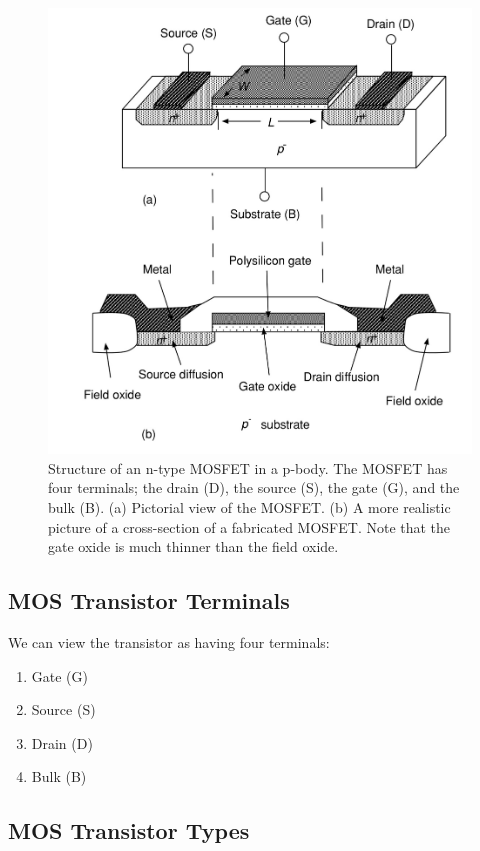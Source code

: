 \documentclass[main]{subfiles}
\begin{document}
\begin{figure}[htbp]
  \centering
  \includegraphics[scale=0.8]{figs/MOSFET_Structure.jpg}
  \caption{Structure of an n-type MOSFET in a p-body. The MOSFET has four terminals; the drain (D), the source (S), the gate (G), and the bulk (B). (a) Pictorial view of the MOSFET. (b) A more realistic picture of a cross-section of a fabricated MOSFET. Note that the gate oxide is much thinner than the field oxide. \cite{book:VLSI}}
  \label{fig:MOSFET_Structure}
\end{figure}\bigskip

\bigskip\subsection{MOS Transistor Terminals}
We can view the transistor as having four terminals:
\begin{enumerate}
\item Gate (G)
\item Source (S)
\item Drain (D)
\item Bulk (B)
\end{enumerate}

\bigskip\subsection{MOS Transistor Types}
\end{document}
